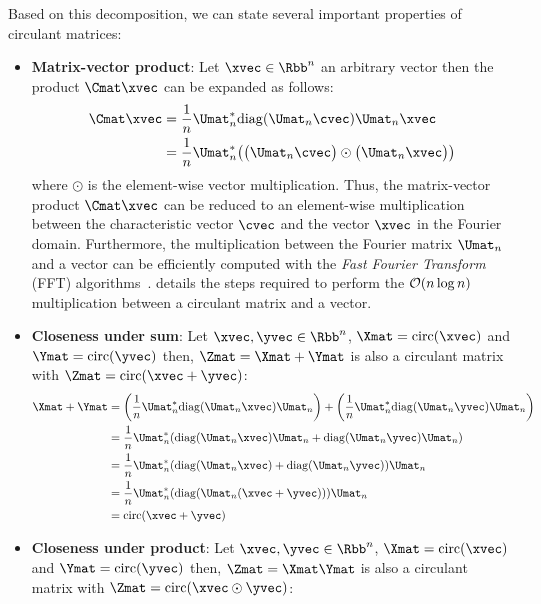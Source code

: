 \noindent
Based on this decomposition, we can state several important properties of circulant matrices:
\begin{itemize}[leftmargin=13pt]
  \item \textbf{Matrix-vector product}: Let $\xvec \in \Rbb^n$ an arbitrary vector then the product $\Cmat \xvec$ can be expanded as follows:
  \begin{align}
    \Cmat \xvec &= \frac{1}{n} \Umat_n^* \diag(\Umat_n \cvec) \Umat_n \xvec  \\
    &= \frac{1}{n} \Umat_n^* \left( \big(\Umat_n \cvec \big) \odot \big( \Umat_n \xvec \big) \right)
  \end{align}
  where $\odot$ is the element-wise vector multiplication.
  Thus, the matrix-vector product $\Cmat \xvec$ can be reduced to an element-wise multiplication between the characteristic vector $\cvec$ and the vector $\xvec$ in the Fourier domain.
  Furthermore, the multiplication between the Fourier matrix $\Umat_n$ and a vector can be efficiently computed with the \emph{Fast Fourier Transform} (FFT) algorithms~\cite{cooley1965algorithm}.
   details the steps required to perform the $\mathcal{O}(n \log n)$ multiplication between  a circulant matrix and a vector.
\item \textbf{Closeness under sum}: Let $\xvec, \yvec \in \Rbb^n$, $\Xmat= \circulant(\xvec)$ and $\Ymat = \circulant(\yvec)$ then, $\Zmat  = \Xmat + \Ymat$ is also a circulant matrix with $\Zmat = \circulant(\xvec + \yvec)$:
    \begin{align}
      \Xmat + \Ymat &= \left( \frac{1}{n} \Umat_n^* \diag(\Umat_n \xvec) \Umat_n \right) + \left( \frac{1}{n} \Umat_n^* \diag(\Umat_n \yvec) \Umat_n \right) \\
      &= \frac{1}{n}  \Umat_n^* \left( \diag(\Umat_n \xvec) \Umat_n  + \diag(\Umat_n \yvec) \Umat_n \right) \\
      &= \frac{1}{n}  \Umat_n^* \left( \diag(\Umat_n \xvec) + \diag(\Umat_n \yvec) \right) \Umat_n  \\
      &= \frac{1}{n}  \Umat_n^* \left( \diag(\Umat_n (\xvec + \yvec)) \right) \Umat_n  \\
      &= \circulant(\xvec + \yvec)
    \end{align}
  \item \textbf{Closeness under product}: Let $\xvec, \yvec \in \Rbb^n$, $\Xmat= \circulant(\xvec)$ and $\Ymat = \circulant(\yvec)$ then, $\Zmat  = \Xmat \Ymat$ is also a circulant matrix with $\Zmat = \circulant(\xvec \odot \yvec)$:

\end{itemize}
